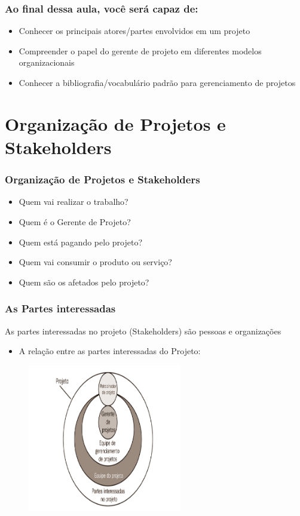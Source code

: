 \begin{frame}
\frametitle{Ao final dessa aula, você será capaz de:}
\begin{itemize}
 \item Conhecer os principais atores/partes envolvidos em um projeto
 \item Compreender o papel do gerente de projeto em diferentes modelos organizacionais
 \item Conhecer a bibliografia/vocabulário padrão para gerenciamento de projetos
\end{itemize}
\end{frame}

\section{Organização de Projetos e Stakeholders}

\begin{frame}
   \frametitle{Organização de Projetos e Stakeholders}
   \begin{itemize}
    \item Quem vai realizar o trabalho?
    \item Quem é o Gerente de Projeto?
    \item Quem está pagando pelo projeto?
    \item Quem vai consumir o produto ou serviço?
    \item Quem são os afetados pelo projeto?
   \end{itemize}
  \end{frame}

    \begin{frame}
   \frametitle{As Partes interessadas}
   As partes interessadas no projeto (Stakeholders) são pessoas e organizações
   \begin{itemize}
    \item A relação entre as partes interessadas do Projeto:
   \end{itemize}

    \begin{figure}
  \centering
  \includegraphics[width = 0.6\textwidth]{figs/fig1_2.png}
 \end{figure}
  \end{frame}
  
